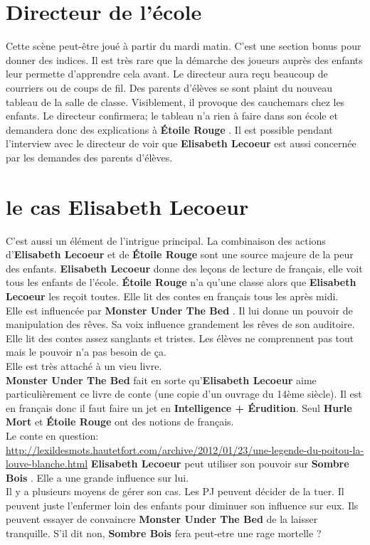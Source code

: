 \documentclass[oneside,12pt]{book}
\newcommand{\Lynn}{\textbf{Étoile Rouge} }
\newcommand{\Peter}{\textbf{Hurle Mort} }
\newcommand{\Leonard}{\textbf{Sombre Bois} }
\newcommand{\Monster}{\textbf{Monster Under The Bed} }
\newcommand{\Elisabeth}{\textbf{Elisabeth Lecoeur} }
\begin{document}
\begin{flushleft}
\section{Directeur de l'école}
\label{directeur}
Cette scène peut-être joué à partir du mardi matin. C'est une section bonus pour donner des indices. Il est très rare que la démarche des joueurs auprès des enfants leur permette d'apprendre cela avant. 
Le directeur aura reçu beaucoup de courriers ou de coups de fil. Des parents d'élèves se sont plaint du nouveau tableau de la salle de classe. Visiblement, il provoque des cauchemars chez les enfants. Le directeur confirmera; le tableau n'a rien à faire dans son école et demandera donc des explications à \Lynn. Il est possible pendant l'interview avec le directeur de voir que \Elisabeth est aussi concernée par les demandes des parents d’élèves.


\section{le cas \Elisabeth}
C'est aussi un élément de l'intrigue principal. La combinaison des actions d'\Elisabeth et de \Lynn sont une source majeure de la peur des enfants. \Elisabeth donne des leçons de lecture de français, elle voit tous les enfants de l'école. \Lynn n'a qu'une classe alors que \Elisabeth les reçoit toutes. 
Elle lit des contes en français tous les après midi.\\
Elle est influencée par \Monster . Il lui donne un pouvoir de manipulation des rêves. Sa voix influence grandement les rêves de son auditoire. Elle lit des contes assez sanglants et tristes. Les élèves ne comprennent pas tout mais le pouvoir n'a pas besoin de ça. \\ 
Elle est très attaché à un vieu livre. \\ 
\Monster fait en sorte qu'\Elisabeth aime particulièrement ce livre de conte (une copie d'un ouvrage du 14ème siècle). Il est en français donc il faut faire un jet en \textbf{Intelligence + Érudition}. Seul \Peter et \Lynn ont des notions de français. \\
Le conte en question: \href{http://lexildesmots.hautetfort.com/archive/2012/01/23/une-legende-du-poitou-la-louve-blanche.html}{http://lexildesmots.hautetfort.com/archive/2012/01/23/une-legende-du-poitou-la-louve-blanche.html} 
\Elisabeth peut utiliser son pouvoir sur \Leonard . Elle a une grande influence sur lui. \\

Il y a plusieurs moyens de gérer son cas. Les PJ peuvent décider de la tuer. Il peuvent juste l'enfermer loin des enfants pour diminuer son influence sur eux. Ils peuvent essayer de convaincre \Monster de la laisser tranquille. S'il dit non, \Leonard fera peut-etre une rage mortelle ? \\ 


\end{flushleft}
\end{document}
